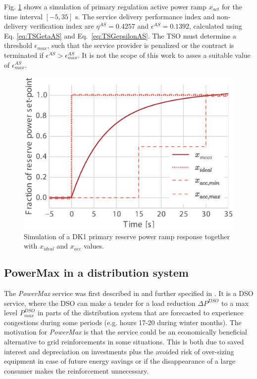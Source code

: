 Fig. \ref{fig:DK1PrimResSim} shows a simulation of primary regulation active power ramp $x_{act}$ for the time interval $[-5,35]$ s. The service delivery performance index and non-delivery verification index are $\eta^{AS}=0.4257$ and $\epsilon^{AS}=0.1392$, calculated using Eq. \eqref{eq:TSGetaAS} and Eq.~\eqref{eq:TSGepsilonAS}. The TSO must determine a threshold $\epsilon_{max}$, such that the service provider is penalized or the contract is terminated if $\epsilon^{AS}>\epsilon^{AS}_{max}$. It is not the scope of this work to asses a suitable value of $\epsilon^{AS}_{max}$.%

\begin{figure}
\centering
\includegraphics[width = \columnwidth]{graphics/tsg/primfreqresp2.eps}
\caption{Simulation of a DK1 primary reserve power ramp response together with $x_{ideal}$ and $x_{acc}$ values.}
\label{fig:DK1PrimResSim}
\end{figure}

\subsection{PowerMax in a distribution system}
The \textit{PowerMax} service was first described in \cite{ding2013development} and further specified in \cite{bondy2014powermax}. It is a DSO service, where the DSO can make a tender for a load reduction $\Delta P^{DSO}$ to a max level $P_{max}^{DSO}$ in parts of the distribution system that are forecasted to experience congestions during some periods (e.g. hours 17-20 during winter months). The motivation for \textit{PowerMax} is that the service could be an economically beneficial alternative to grid reinforcements in some situations. This is both due to saved interest and depreciation on investments plus the avoided risk of over-sizing equipment in case of future energy savings or if the disappearance of a large consumer makes the reinforcement unnecessary.%

